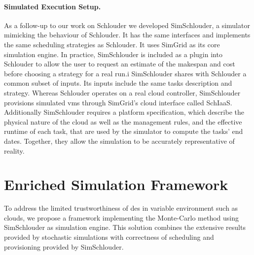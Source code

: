 \documentclass[]{llncs}
\begin{document}
\paragraph{Simulated Execution Setup.}
As a follow-up to our work on Schlouder we developed SimSchlouder, a simulator
mimicking the behaviour of Schlouder. It has the same interfaces and implements
the same scheduling strategies as Schlouder. It uses SimGrid as its core
simulation engine. In practice, SimSchlouder is included as a plugin into
Schlouder to allow the user to request an estimate of the makespan and cost
before choosing a strategy for a real run.i
%
SimSchlouder  shares with Schlouder a common subset of inputs. Its inputs
include the same tasks description and strategy. Whereas Schlouder operates on a
real cloud controller, SimSchlouder provisions simulated \acp{vm} through
SimGrid's cloud interface called SchIaaS. Additionally SimSchlouder requires a
platform specification, which describe the physical nature of the cloud as well
as the management rules, and the effective runtime of each task, that are used
by the simulator to compute the tasks' end dates. Together, they allow the
simulation to be accurately representative of reality.

\section{Enriched Simulation Framework}\label{sec:enriched-sim}


To address the limited trustworthiness of \ac{des} in variable environment such
as clouds, we propose a framework implementing the Monte-Carlo method using 
SimSchlouder as simulation engine. This  solution combines the extensive results
provided  by stochastic simulations with correctness of scheduling and 
provisioning provided by SimSchlouder.
\end{document}
